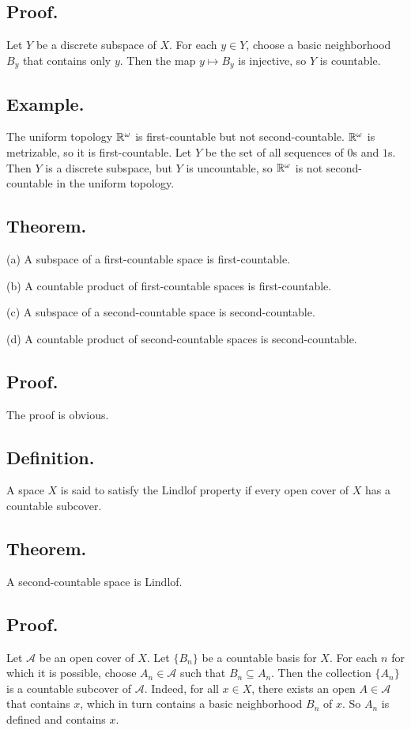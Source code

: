 \documentclass[titlepage]{article}
\begin{document}
\subsection{Proof.} Let $Y$ be a discrete subspace of $X$. For each $y \in Y$, choose a basic neighborhood $B_{y}$ that contains only $y$. Then the map $y \mapsto B_{y}$ is injective, so $Y$ is countable.

\subsection{Example.} The uniform topology $\mathbb{R}^{\omega}$ is first-countable but not second-countable. $\mathbb{R}^{\omega}$ is metrizable, so it is first-countable. Let $Y$ be the set of all sequences of $0$s and $1$s. Then $Y$ is a discrete subspace, but $Y$ is uncountable, so $\mathbb{R}^{\omega}$ is not second-countable in the uniform topology.

\subsection{Theorem.} 

(a) A subspace of a first-countable space is first-countable.

(b) A countable product of first-countable spaces is first-countable.

(c) A subspace of a second-countable space is second-countable.

(d) A countable product of second-countable spaces is second-countable.

\subsection{Proof.} The proof is obvious.

\subsection{Definition.} A space $X$ is said to satisfy the Lindlof property if every open cover of $X$ has a countable subcover.

\subsection{Theorem.} A second-countable space is Lindlof.

\subsection{Proof.} Let $\mathcal{A}$ be an open cover of $X$. Let $\{B_{n}\}$ be a countable basis for $X$. For each $n$ for which it is possible, choose $A_{n} \in \mathcal{A}$ such that $B_{n} \subseteq A_{n}$. Then the collection $\{A_{n}\}$ is a countable subcover of $\mathcal{A}$. Indeed, for all $x \in X$, there exists an open $A \in \mathcal{A}$ that contains $x$, which in turn contains a basic neighborhood $B_{n}$ of $x$. So $A_{n}$ is defined and contains $x$.
\end{document}
